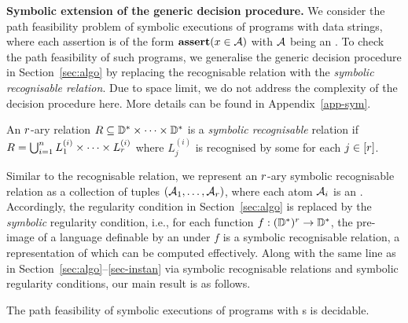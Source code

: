 \smallskip
\noindent
\textbf{Symbolic extension of the generic decision procedure.} We consider the path feasibility problem of symbolic executions of programs with data strings, 
 where each assertion is of the form $\textbf{assert}(x \in \mathcal{A})$ with $\mathcal{A}$ being an \SA. 
To check the path feasibility of such programs, we generalise the generic decision procedure in Section~\ref{sec:algo} by replacing the recognisable relation  with the \emph{symbolic recognisable relation}. 
Due to space limit, we do not address the complexity of the decision procedure here. More details can be found in Appendix~\ref{app-sym}.

\begin{definition}[Symbolic recognisable relations]
	An $r$-ary relation $R \subseteq \mathbb{D}^*\times \cdots\times \mathbb{D}^*$ is a \emph{symbolic recognisable} relation if $R=\bigcup_{i=1}^n L^{(i)}_1 \times \cdots \times L^{(i)}_r$ where $L^{(i)}_j$ is recognised by some \SA{} for each $j\in [r]$.
\end{definition}
Similar to the recognisable relation, we represent an $r$-ary symbolic recognisable relation as a collection of tuples $(\mathcal{A}_1, \ldots, \mathcal{A}_r)$, where each atom $\mathcal{A}_i$ is an \SA{}.
Accordingly, the regularity condition in Section~\ref{sec:algo} is replaced by the \emph{symbolic} regularity condition, i.e., for each function $f: (\mathbb{D}^*)^r \to \mathbb{D}^*$, the pre-image of a language definable by an \SA{} under $f$ is a symbolic recognisable relation, a representation of which can be computed effectively. Along with the same line as in Section~\ref{sec:algo}--\ref{sec-instan} via symbolic recognisable relations and symbolic regularity conditions, our main result is as follows. 

\begin{theorem}
The path feasibility of symbolic executions of programs with %
 \SSPT{}s %
is decidable.
\end{theorem}






